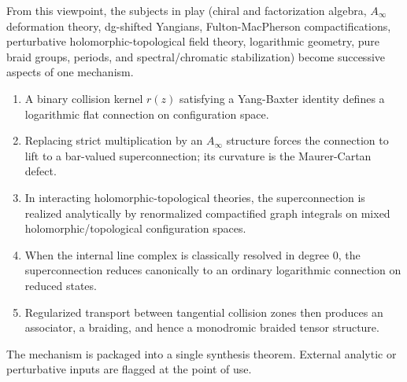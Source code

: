 From this viewpoint, the subjects in play (chiral and factorization algebra, $A_\infty$ deformation theory, dg-shifted Yangians, Fulton-MacPherson compactifications, perturbative holomorphic-topological field theory, logarithmic geometry, pure braid groups, periods, and spectral/chromatic stabilization) become successive aspects of one mechanism.
\begin{enumerate}[label=\textup{(\arabic*)}]
 \item A binary collision kernel $r(z)$ satisfying a Yang-Baxter identity defines a logarithmic flat connection on configuration space.
 \item Replacing strict multiplication by an $A_\infty$ structure forces the connection to lift to a bar-valued superconnection; its curvature is the Maurer-Cartan defect.
 \item In interacting holomorphic-topological theories, the superconnection is realized analytically by renormalized compactified graph integrals on mixed holomorphic/topological configuration spaces.
 \item When the internal line complex is classically resolved in degree $0$, the superconnection reduces canonically to an ordinary logarithmic connection on reduced states.
 \item Regularized transport between tangential collision zones then produces an associator, a braiding, and hence a monodromic braided tensor structure.
\end{enumerate}

The mechanism is packaged into a single synthesis theorem. External analytic or perturbative inputs are flagged at the point of use.

